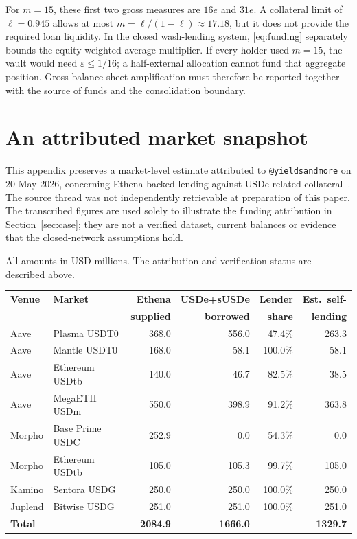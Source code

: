 \documentclass[12pt,oneside]{article}
\begin{document}
For $m=15$, these first two gross measures are $16e$ and $31e$.
A collateral limit of $\ell=0.945$ allows at most
$m=\ell/(1-\ell)\approx17.18$, but it does not provide the required
loan liquidity. In the closed wash-lending system,
\eqref{eq:funding} separately bounds the equity-weighted average
multiplier. If every holder used $m=15$, the vault would need
$\varepsilon\leq1/16$; a half-external allocation cannot fund that
aggregate position. Gross balance-sheet amplification must therefore
be reported together with the source of funds and the consolidation
boundary.

\section{An attributed market snapshot}
\label{app:snapshot}
This appendix preserves a market-level estimate attributed to
\texttt{@yieldsandmore} on 20 May 2026, concerning Ethena-backed
lending against USDe-related collateral~\cite{yam}. The source thread
was not independently retrievable at preparation of this paper.
The transcribed figures are used solely to illustrate the funding
attribution in Section~\ref{sec:case}; they are not a verified dataset,
current balances or evidence that the closed-network assumptions hold.

All amounts in USD millions. The attribution and verification status are
described above.
\begin{center}
\small
\begin{tabular}{llrrrr}
\hline
\textbf{Venue} & \textbf{Market} & \textbf{Ethena} & \textbf{USDe+sUSDe}
  & \textbf{Lender} & \textbf{Est.\ self-} \\
               &                 & \textbf{supplied} & \textbf{borrowed}
  & \textbf{share}  & \textbf{lending} \\
\hline
Aave    & Plasma USDT0    & 368.0 & 556.0 & 47.4\%  & 263.3 \\
Aave    & Mantle USDT0    & 168.0 &  58.1 & 100.0\% &  58.1 \\
Aave    & Ethereum USDtb  & 140.0 &  46.7 & 82.5\%  &  38.5 \\
Aave    & MegaETH USDm    & 550.0 & 398.9 & 91.2\%  & 363.8 \\
Morpho  & Base Prime USDC & 252.9 &   0.0 & 54.3\%  &   0.0 \\
Morpho  & Ethereum USDtb  & 105.0 & 105.3 & 99.7\%  & 105.0 \\
Kamino  & Sentora USDG    & 250.0 & 250.0 & 100.0\% & 250.0 \\
Juplend & Bitwise USDG    & 251.0 & 251.0 & 100.0\% & 251.0 \\
\hline
\textbf{Total} & & \textbf{2084.9} & \textbf{1666.0} & & \textbf{1329.7} \\
\hline
\end{tabular}
\end{center}
\end{document}
